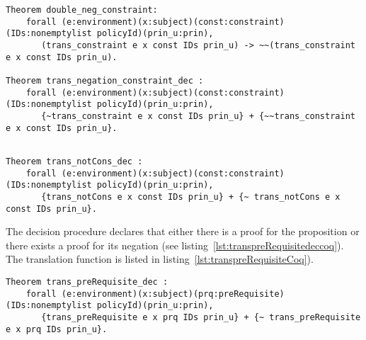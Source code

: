 \begin{lstlisting}
Theorem double_neg_constraint:
    forall (e:environment)(x:subject)(const:constraint)(IDs:nonemptylist policyId)(prin_u:prin),
       (trans_constraint e x const IDs prin_u) -> ~~(trans_constraint e x const IDs prin_u).
  
Theorem trans_negation_constraint_dec :
    forall (e:environment)(x:subject)(const:constraint)(IDs:nonemptylist policyId)(prin_u:prin),
       {~trans_constraint e x const IDs prin_u} + {~~trans_constraint e x const IDs prin_u}.
       
\end{lstlisting}

\begin{lstlisting}
Theorem trans_notCons_dec :
    forall (e:environment)(x:subject)(const:constraint)(IDs:nonemptylist policyId)(prin_u:prin),
       {trans_notCons e x const IDs prin_u} + {~ trans_notCons e x const IDs prin_u}.

\end{lstlisting}

The decision procedure  declares that either there is a proof for the proposition  or there exists a proof for its negation (see listing~\ref{lst:transpreRequisitedeccoq}). The translation function  is listed in listing~\ref{lst:transpreRequisiteCoq}). 


\begin{lstlisting}
Theorem trans_preRequisite_dec :
    forall (e:environment)(x:subject)(prq:preRequisite)(IDs:nonemptylist policyId)(prin_u:prin),
       {trans_preRequisite e x prq IDs prin_u} + {~ trans_preRequisite e x prq IDs prin_u}.
\end{lstlisting}


